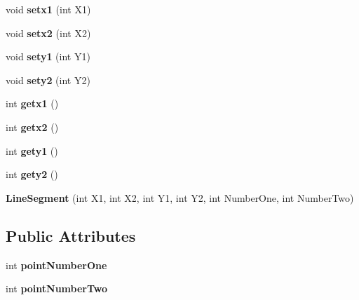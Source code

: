 \begin{DoxyCompactItemize}
\item 
\hypertarget{class_line_segment_aabdfa2bc55cecfe681fe824164f7ffc0}{
void {\bfseries setx1} (int X1)}
\label{class_line_segment_aabdfa2bc55cecfe681fe824164f7ffc0}

\item 
\hypertarget{class_line_segment_a0ff3ceeb0fe95f39c28dfbfd1a0bb05a}{
void {\bfseries setx2} (int X2)}
\label{class_line_segment_a0ff3ceeb0fe95f39c28dfbfd1a0bb05a}

\item 
\hypertarget{class_line_segment_a337d14221f23e9a2dbbb020006097d22}{
void {\bfseries sety1} (int Y1)}
\label{class_line_segment_a337d14221f23e9a2dbbb020006097d22}

\item 
\hypertarget{class_line_segment_a54f151198646da740a39acb7cfc88d37}{
void {\bfseries sety2} (int Y2)}
\label{class_line_segment_a54f151198646da740a39acb7cfc88d37}

\item 
\hypertarget{class_line_segment_a89a7f2edb01d8f7e25640bf26c161d6a}{
int {\bfseries getx1} ()}
\label{class_line_segment_a89a7f2edb01d8f7e25640bf26c161d6a}

\item 
\hypertarget{class_line_segment_a8339d5ab25c7dff940e8eb77dae3720a}{
int {\bfseries getx2} ()}
\label{class_line_segment_a8339d5ab25c7dff940e8eb77dae3720a}

\item 
\hypertarget{class_line_segment_aa8ffd38d8b530bf6235dcc55914a5318}{
int {\bfseries gety1} ()}
\label{class_line_segment_aa8ffd38d8b530bf6235dcc55914a5318}

\item 
\hypertarget{class_line_segment_a65a169be88e69c3e6f8348c6b378da5f}{
int {\bfseries gety2} ()}
\label{class_line_segment_a65a169be88e69c3e6f8348c6b378da5f}

\item 
\hypertarget{class_line_segment_a3a103953d3bac4b55754f69871f7001e}{
{\bfseries LineSegment} (int X1, int X2, int Y1, int Y2, int NumberOne, int NumberTwo)}
\label{class_line_segment_a3a103953d3bac4b55754f69871f7001e}

\end{DoxyCompactItemize}
\subsection*{Public Attributes}
\begin{DoxyCompactItemize}
\item 
\hypertarget{class_line_segment_aa2034e1e99b7afc656499327c3361aee}{
int {\bfseries pointNumberOne}}
\label{class_line_segment_aa2034e1e99b7afc656499327c3361aee}

\item 
\hypertarget{class_line_segment_a66c9038a6e33eefbe7dedc95331bda72}{
int {\bfseries pointNumberTwo}}
\label{class_line_segment_a66c9038a6e33eefbe7dedc95331bda72}

\end{DoxyCompactItemize}


